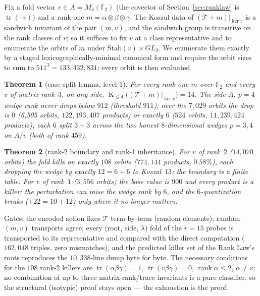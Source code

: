 \documentclass[11pt]{article}
\newtheorem{theorem}{Theorem}
\theoremstyle{definition}
\newcommand{\F}{\mathbb{F}_2}
\newcommand{\T}{\mathcal{T}}
\newcommand{\rk}{\operatorname{rank}}
\newcommand{\kos}{\operatorname{K}}
\begin{document}
Fix a fold vector $v \in A = M_3(\F)$ (the covector of
Section~\ref{sec:ranklaw} is $\operatorname{tr}(\cdot\, v)$) and a rank-one
$m = \alpha\otimes\beta\otimes\gamma$. The Koszul data of
$(\T + m)|_{\ker v}$ is a sandwich invariant of the pair $(m, v)$, and the
sandwich group is transitive on the rank classes of $v$; so it suffices to
fix $v$ at a class representative and to enumerate the orbits of $m$ under
$\mathrm{Stab}(v)\times GL_3$. We enumerate them exactly by a staged
lexicographically-minimal canonical form and require the orbit sizes to
sum to $511^3 = 133{,}432{,}831$; every orbit is then evaluated.

\begin{theorem}[case-split lemma, level 1]
For every rank-one $m$ over $\F$ and every $v$ of matrix rank~$3$, on any
side, $\kos_{\le 4}\big((\T+m)|_{\ker v}\big) = 14$. The side-$A$, $p=4$
wedge rank never drops below $912$ (threshold $911$); over the $7{,}029$
orbits the drop is $0$ (6{,}505 orbits, $122{,}193{,}407$ products) or
exactly $6$ ($524$ orbits, $11{,}239{,}424$ products), each $6$ split
$3+3$ across the two honest $8$-dimensional wedges $p=3,4$ on $A/v$
(both of rank $459$).
\end{theorem}

\begin{theorem}[rank-2 boundary and rank-1 inheritance]
For $v$ of rank~$2$ ($14{,}070$ orbits) the fold kills on exactly $108$
orbits ($774{,}144$ products, $0.58\%$), each dropping the wedge by
exactly $12 = 6+6$ to Koszul~$13$; the boundary is a finite table.
For $v$ of rank~$1$ ($3{,}556$ orbits) the base value is $900$ and every
product is a killer; the perturbation can raise the wedge rank by $6$,
and the $6$-quantization breaks ($+22 = 10+12$) only where it no longer
matters.
\end{theorem}

Gates: the encoded action fixes $\T$ term-by-term (random elements); random
$(m,v)$ transports agree; every (root, side, $\lambda$) fold of the
$r=15$ probes is transported to its representative and compared with the
direct computation ($162{,}048$ triples, zero mismatches), and the
predicted killer set of the Rank Law's roots reproduces the
$10{,}338$-line dump byte for byte. The necessary conditions for the
$108$ rank-2 killers are $\operatorname{tr}(\alpha\beta\gamma)=1$,
$\operatorname{tr}(v\beta\gamma)=0$, $\rk\alpha\le 2$, $\alpha\ne v$; no
combination of up to three matrix-rank/trace invariants is a pure
classifier, so the structural (isotypic) proof stays open --- the
exhaustion is the proof.
\end{document}
